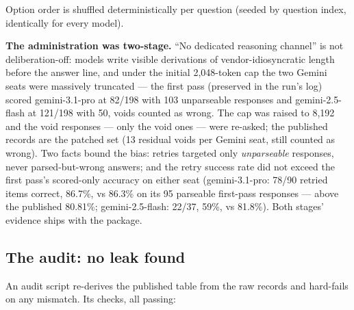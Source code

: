 \documentclass{article}
\begin{document}
Option order is shuffled deterministically per question (seeded by question index, identically for every model).

\textbf{The administration was two-stage.} ``No dedicated reasoning channel'' is not deliberation-off: models write visible derivations of vendor-idiosyncratic length before the answer line, and under the initial 2,048-token cap the two Gemini seats were massively truncated --- the first pass (preserved in the run's log) scored gemini-3.1-pro at 82/198 with 103 unparseable responses and gemini-2.5-flash at 121/198 with 50, voids counted as wrong. The cap was raised to 8,192 and the void responses --- only the void ones --- were re-asked; the published records are the patched set (13 residual voids per Gemini seat, still counted as wrong). Two facts bound the bias: retries targeted only \emph{unparseable} responses, never parsed-but-wrong answers; and the retry success rate did not exceed the first pass's scored-only accuracy on either seat (gemini-3.1-pro: 78/90 retried items correct, 86.7\%, vs 86.3\% on its 95 parseable first-pass responses --- above the published 80.81\%; gemini-2.5-flash: 22/37, 59\%, vs 81.8\%). Both stages' evidence ships with the package.

\subsection{The audit: no leak found}\label{the-audit-no-leak-found}

An audit script re-derives the published table from the raw records and hard-fails on any mismatch. Its checks, all passing:
\end{document}
